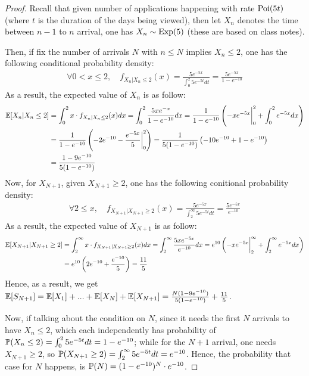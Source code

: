\documentclass{article}
\begin{document}
\begin{proof}
    Recall that given number of applications happening with rate $\mathrm{Poi}(5t)$ (where $t$ is the duration of the days being viewed), then let $X_n$ denotes the time between $n-1$ to $n$ arrival, one has $X_n \sim \mathrm{Exp}(5)$ (these are based on class notes).

    Then, if fix the number of arrivals $N$ with $n\leq N$ implies $X_n\leq 2$, one has the following conditional probability density:
    \begin{align}
        \forall 0<x\leq 2,\quad f_{X_n|X_n\leq 2}(x) = \frac{5e^{-5x}}{\int_{0}^{2}5e^{-5t}dt} = \frac{5e^{-5x}}{1-e^{-10}}
    \end{align}
    As a result, the expected value of $X_n$ is as follow:
    \begin{align}
        \mathbb{E}[X_n|X_n\leq 2]&=\int_{0}^{2}x\cdot f_{X_n|X_n\leq 2}(x)dx = \int_{0}^{2}\frac{5xe^{-x}}{1-e^{-10}}dx = \frac{1}{1-e^{-10}}\left(-xe^{-5x}\bigg|_{0}^{2} + \int_{0}^{2}e^{-5x}dx\right)\\
        &= \frac{1}{1-e^{-10}}\left(-2e^{-10}-\frac{e^{-5x}}{5}\bigg|_{0}^{2}\right) = \frac{1}{5(1-e^{-10})}\left(-10e^{-10}+1-e^{-10}\right)\\
        &= \frac{1-9e^{-10}}{5(1-e^{-10})}
    \end{align}
    Now, for $X_{N+1}$, given $X_{N+1}\geq 2$, one has the following conitional probability density:
    \begin{align}
        \forall 2\leq x, \quad f_{X_{N+1}|X_{N+1}\geq 2}(x) = \frac{5e^{-5x}}{\int_{2}^{\infty}5e^{-5t}dt} = \frac{5e^{-5x}}{e^{-10}}
    \end{align}
    As a result, the expected value of $X_{N+1}$ is as follow:
    \begin{align}
        \mathbb{E}[X_{N+1}|X_{N+1}\geq 2] &= \int_{2}^{\infty}x\cdot f_{X_{N+1}|X_{N+1}\geq 2}(x)dx=\int_{2}^{\infty}\frac{5xe^{-5x}}{e^{-10}}dx = e^{10}\left(-xe^{-5x}\bigg|_{2}^{\infty} + \int_{2}^{\infty}e^{-5x}dx\right)\\
        &= e^{10}\left(2e^{-10} + \frac{e^{-10}}{5}\right) = \frac{11}{5}
    \end{align}
    Hence, as a result, we get $\mathbb{E}[S_{N+1}] = \mathbb{E}[X_1]+...+\mathbb{E}[X_N]+\mathbb{E}[X_{N+1}] = \frac{N(1-9e^{-10})}{5(1-e^{-10})} + \frac{11}{5}$.

    \hfil

    Now, if talking about the condition on $N$, since it needs the first $N$ arrivals to have $X_n\leq 2$, which each independently has probability of $\mathbb{P}(X_n\leq 2) = \int_{0}^{2}5e^{-5t}dt = 1-e^{-10}$; while for the $N+1$ arrival, one needs $X_{N+1}\geq 2$, so $\mathbb{P}(X_{N+1}\geq 2) = \int_{2}^{\infty}5e^{-5t}dt = e^{-10}$. Hence, the probability that case for $N$ happens, is $\mathbb{P}(N)=(1-e^{-10})^N \cdot e^{-10}$. 


\end{proof}
\end{document}
